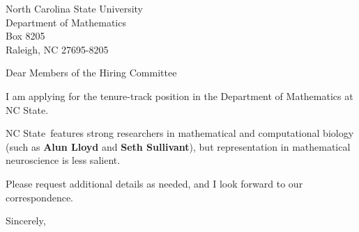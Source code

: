 




	
	
	\def\School{NC State}
	
	\begin{letter}
		{North Carolina State University\\
			Department of Mathematics\\
			Box 8205\\
			Raleigh, NC 27695-8205
		}
		
		\opening{Dear Members of the Hiring Committee}
		
		
		I am applying for the tenure-track position in the Department of Mathematics at \School. 
		
		
		
		\School~features strong researchers in mathematical and computational biology (such as \textbf{Alun Lloyd} and \textbf{Seth Sullivant}), but representation in mathematical neuroscience is less salient. 
		
		
		
		
		
		Please request additional details as needed, and I look forward to our correspondence.
		
		\closing{Sincerely,}
	\end{letter}
